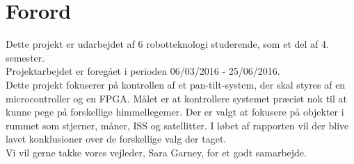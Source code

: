 \section*{Forord}

Dette projekt er udarbejdet af 6 robotteknologi studerende, som et del af 4. semester.\\ Projektarbejdet er foregået i perioden 06/03/2016 - 25/06/2016. 
\\
Dette projekt fokuserer på kontrollen af et pan-tilt-system, der skal styres af en microcontroller og en FPGA. Målet er at kontrollere systemet præcist nok til at kunne pege på forskellige himmellegemer. Der er valgt at fokusere på objekter i rummet som stjerner, måner, ISS og satellitter. I løbet af rapporten vil der blive lavet konklusioner over de forskellige valg der taget.
\\
Vi vil gerne takke vores vejleder, Sara Garney, for et godt samarbejde.